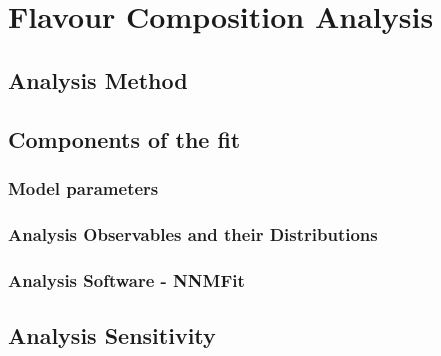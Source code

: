 \setchapterpreamble[u]{\margintoc}
\chapter{Flavour Composition Analysis}

\section{Analysis Method}
\label{sec:analysis}

\section{Components of the fit}
\label{sec:components}

\subsection{Model parameters}
\label{sec:params}

\subsection{Analysis Observables and their Distributions}
\label{sec:hists}

\subsection{Analysis Software - NNMFit}
\label{sec:nnmfit}

\section{Analysis Sensitivity}
\label{sensitivty}

